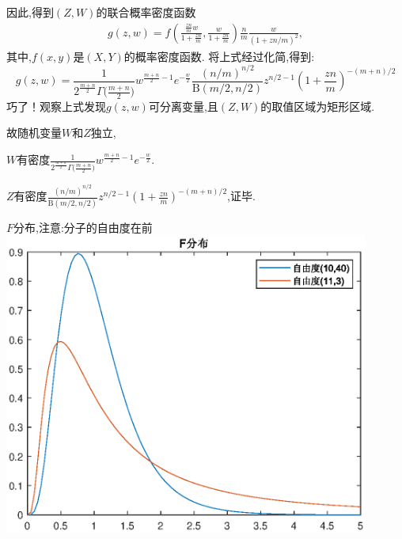 	\begin{frame}
		因此,得到$(Z,W)$的联合概率密度函数
		\begin{equation}
			\begin{split}
				g(z,w) = f(\frac{\frac{zn}{m}w}{1+\frac{zn}{m}},\frac{w}{1+\frac{zn}{m}})\frac{n}{m}\frac{w}{(1+zn/m)^2},
			\end{split}
		\end{equation}
		其中,$f(x,y)$是$(X,Y)$的概率密度函数.
		将上式经过化简,得到:
		\begin{equation}
			g(z,w) = \frac{1}{2^{\frac{m+n}{2}}\Gamma{\big(\frac{m+n}{2}\big)}}w^{\frac{m+n}{2}-1}e^{-\frac{w}{2}}
			\frac{(n/m)^{n/2}}{\mathrm{B}(m/2,n/2)}z^{n/2-1}(1+\frac{zn}{m})^{-(m+n)/2}
		\end{equation}
		巧了！观察上式发现$g(z,w)$可分离变量,且$(Z,W)$的取值区域为矩形区域.
		
		故随机变量$W$和$Z$独立,
			
		$W$有密度$\frac{1}{2^{\frac{m+n}{2}}\Gamma{\big(\frac{m+n}{2}\big)}}w^{\frac{m+n}{2}-1}e^{-\frac{w}{2}}$.
		
		$Z$有密度$\frac{(n/m)^{n/2}}{\mathrm{B}(m/2,n/2)}z^{n/2-1}(1+\frac{zn}{m})^{-(m+n)/2}$,证毕.
		

		
	\end{frame}

	\begin{frame}{$F$分布,注意:分子的自由度在前}
		\centering
		\includegraphics[width = 0.9\textwidth]{images/fdistribution.eps}
	\end{frame}


